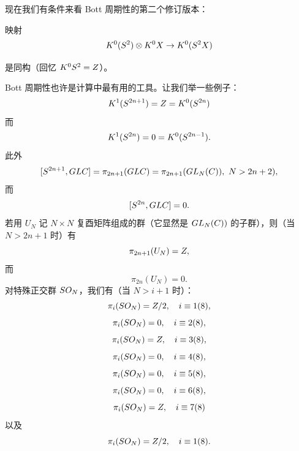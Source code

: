 现在我们有条件来看 Bott 周期性的第二个修订版本：

映射
\[  K^0(S^2)\otimes K^0X\to K^0(S^2X) \]

是同构（回忆 $ K^0S^2 = Z$）。

Bott 周期性也许是计算中最有用的工具。让我们举一些例子：
\[  K^1(S^{2n+1}) = Z =  K^0(S^{2n}) \]
而
\[  K^1(S^{2n}) = 0 =  K^0(S^{2n-1}). \]
此外
\[ [S^{2n+1}, GLC] = \pi_{2n+1}(GLC) = \pi_{2n+1}(GL_N(C)),\ N > 2n+2), \]
而
\[ [S^{2n}, GLC] = 0. \]
若用 $U_N$ 记 $N\times N$ 复酉矩阵组成的群（它显然是 $GL_N(C))$ 的子群），则（当 $N > 2n+1$ 时）有
\[ \pi_{2n+1}(U_N) = Z, \]
而
\[ \pi_{2n}(U_N) = 0. \]
对特殊正交群 $SO_N$，我们有（当 $N > i+1$ 时）：
\[ \pi_i(SO_N) = Z/2,\quad i\equiv 1(8), \]
\[ \pi_i(SO_N) = 0,\quad i\equiv 2(8), \]
\[ \pi_i(SO_N) = Z,\quad i\equiv 3(8), \]
\[ \pi_i(SO_N) = 0,\quad i\equiv 4(8), \]
\[ \pi_i(SO_N) = 0,\quad i\equiv 5(8), \]
\[ \pi_i(SO_N) = 0,\quad i\equiv 6(8), \]
\[ \pi_i(SO_N) = Z,\quad i\equiv 7(8) \]
以及
\[ \pi_i(SO_N) = Z/2,\quad i\equiv 1(8). \]


